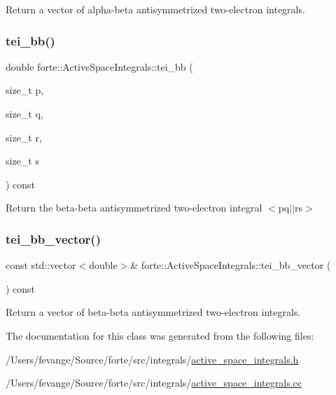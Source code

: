 Return a vector of alpha-\/beta antisymmetrized two-\/electron integrals. 

\mbox{\label{classforte_1_1_active_space_integrals_aac5d72add98a1f2583046687108941f6}} 
\subsubsection{\texorpdfstring{tei\+\_\+bb()}{tei\_bb()}}
{\footnotesize\ttfamily double forte\+::\+Active\+Space\+Integrals\+::tei\+\_\+bb (\begin{DoxyParamCaption}\item[{size\+\_\+t}]{p,  }\item[{size\+\_\+t}]{q,  }\item[{size\+\_\+t}]{r,  }\item[{size\+\_\+t}]{s }\end{DoxyParamCaption}) const\hspace{0.3cm}{\ttfamily [inline]}}



Return the beta-\/beta antisymmetrized two-\/electron integral $<$pq$\vert$$\vert$rs$>$ 

\mbox{\label{classforte_1_1_active_space_integrals_a04d77c7dfc8f4b8a2b80a2180da324cc}} 
\subsubsection{\texorpdfstring{tei\+\_\+bb\+\_\+vector()}{tei\_bb\_vector()}}
{\footnotesize\ttfamily const std\+::vector$<$double$>$\& forte\+::\+Active\+Space\+Integrals\+::tei\+\_\+bb\+\_\+vector (\begin{DoxyParamCaption}{ }\end{DoxyParamCaption}) const\hspace{0.3cm}{\ttfamily [inline]}}



Return a vector of beta-\/beta antisymmetrized two-\/electron integrals. 



The documentation for this class was generated from the following files\+:\begin{DoxyCompactItemize}
\item 
/\+Users/fevange/\+Source/forte/src/integrals/\mbox{\hyperlink{active__space__integrals_8h}{active\+\_\+space\+\_\+integrals.\+h}}\item 
/\+Users/fevange/\+Source/forte/src/integrals/\mbox{\hyperlink{active__space__integrals_8cc}{active\+\_\+space\+\_\+integrals.\+cc}}\end{DoxyCompactItemize}
